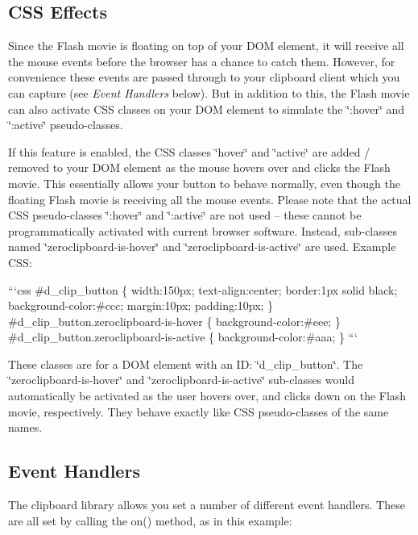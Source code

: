 \subsection*{C\-S\-S Effects}

Since the Flash movie is floating on top of your D\-O\-M element, it will receive all the mouse events before the browser has a chance to catch them. However, for convenience these events are passed through to your clipboard client which you can capture (see {\itshape Event Handlers} below). But in addition to this, the Flash movie can also activate C\-S\-S classes on your D\-O\-M element to simulate the \char`\"{}\-:hover\char`\"{} and \char`\"{}\-:active\char`\"{} pseudo-\/classes.

If this feature is enabled, the C\-S\-S classes \char`\"{}hover\char`\"{} and \char`\"{}active\char`\"{} are added / removed to your D\-O\-M element as the mouse hovers over and clicks the Flash movie. This essentially allows your button to behave normally, even though the floating Flash movie is receiving all the mouse events. Please note that the actual C\-S\-S pseudo-\/classes \char`\"{}\-:hover\char`\"{} and \char`\"{}\-:active\char`\"{} are not used -- these cannot be programmatically activated with current browser software. Instead, sub-\/classes named \char`\"{}zeroclipboard-\/is-\/hover\char`\"{} and \char`\"{}zeroclipboard-\/is-\/active\char`\"{} are used. Example C\-S\-S\-:

```css \#d\-\_\-clip\-\_\-button \{ width\-:150px; text-\/align\-:center; border\-:1px solid black; background-\/color\-:\#ccc; margin\-:10px; padding\-:10px; \} \#d\-\_\-clip\-\_\-button.\-zeroclipboard-\/is-\/hover \{ background-\/color\-:\#eee; \} \#d\-\_\-clip\-\_\-button.\-zeroclipboard-\/is-\/active \{ background-\/color\-:\#aaa; \} ```

These classes are for a D\-O\-M element with an I\-D\-: \char`\"{}d\-\_\-clip\-\_\-button\char`\"{}. The \char`\"{}zeroclipboard-\/is-\/hover\char`\"{} and \char`\"{}zeroclipboard-\/is-\/active\char`\"{} sub-\/classes would automatically be activated as the user hovers over, and clicks down on the Flash movie, respectively. They behave exactly like C\-S\-S pseudo-\/classes of the same names.

\subsection*{Event Handlers}

The clipboard library allows you set a number of different event handlers. These are all set by calling the {\ttfamily on()} method, as in this example\-:


